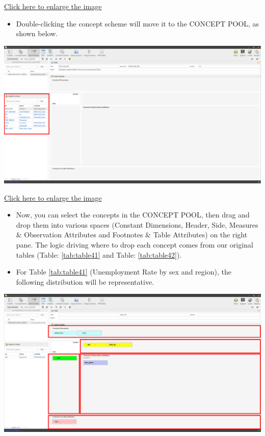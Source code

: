 \documentclass[
]{book}
\providecommand{\tightlist}{%
  \setlength{\itemsep}{0pt}\setlength{\parskip}{0pt}}
\begin{document}
\href{images/image132.png}{Click here to enlarge the image}

\begin{itemize}
\tightlist
\item
  Double-clicking the concept scheme will move it to the CONCEPT POOL, as shown below.
\end{itemize}

\begin{center}\includegraphics[width=1\linewidth]{./images/image134} \end{center}

\href{images/image134.png}{Click here to enlarge the image}

\begin{itemize}
\item
  Now, you can select the concepts in the CONCEPT POOL, then drag and drop them into various spaces (Constant Dimensions, Header, Side, Measures \& Observation Attributes and Footnotes \& Table Attributes) on the right pane. The logic driving where to drop each concept comes from our original tables (Table: \ref{tab:table41} and Table: \ref{tab:table42}).
\item
  For Table \ref{tab:table41} (Unemployment Rate by sex and region), the following distribution will be representative.
\end{itemize}

\begin{center}\includegraphics[width=1\linewidth]{./images/image136} \end{center}
\end{document}
